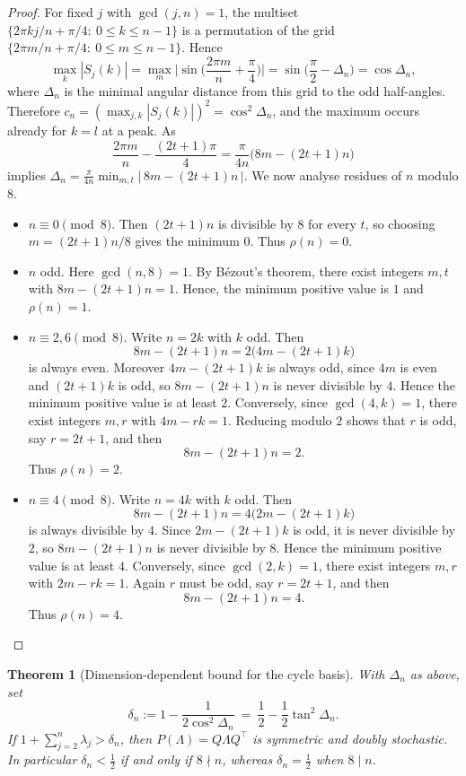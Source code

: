 \documentclass[12pt,fleqn]{amsart}
\renewcommand{\le}{\leqslant}
\newtheorem{thm}{Theorem}
\theoremstyle{definition}
\theoremstyle{remark}
\newcommand{\1}{\mathbf{1}}
\newcommand{\Lam}{\Lambda}
\begin{document}
\begin{proof}
For fixed $j$ with $\gcd(j,n)=1$, the multiset $\{2\pi kj/n+\pi/4:\ 0\le k\le n-1\}$ is a permutation of the grid $\{2\pi m/n+\pi/4:\ 0\le m\le n-1\}$. Hence
\[
\max_k|S_j(k)|=\max_m\Big|\sin\Big(\frac{2\pi m}{n}+\frac{\pi}{4}\Big)\Big|
=\sin\!\Big(\frac{\pi}{2}-\Delta_n\Big)=\cos\Delta_n,
\]
where $\Delta_n$ is the minimal angular distance from this grid to the odd half-angles. Therefore $c_n=(\max_{j,k}|S_j(k)|)^2=\cos^2\Delta_n$, and the maximum occurs already for $k=l$ at a peak. As
\[
\frac{2\pi m}{n}-\frac{(2t+1)\pi}{4}=\frac{\pi}{4n}\big(8m-(2t+1)n\big)
\]
implies $\Delta_n=\tfrac{\pi}{4n}\min_{m,t}|\,8m-(2t+1)n\,|$. We now analyse residues of $n$ modulo $8$.
\begin{itemize}
\item {$n\equiv0\pmod 8$.}
Then $(2t+1)n$ is divisible by $8$ for every $t$, so choosing $m=(2t+1)n/8$ gives the minimum $0$. Thus $\rho(n)=0$.

\item {$n$ odd.}
Here $\gcd(n,8)=1$. By Bézout's theorem, there exist integers $m,t$ with $8m-(2t+1)n=1$. Hence, the minimum positive value is $1$ and $\rho(n)=1$.

\item {$n\equiv 2,6\pmod 8$.}
Write $n=2k$ with $k$ odd. Then
\[
8m-(2t+1)n = 2\bigl(4m-(2t+1)k\bigr)
\]
is always even. Moreover $4m-(2t+1)k$ is always odd, since $4m$ is even and $(2t+1)k$ is odd, so $8m-(2t+1)n$ is never divisible by $4$. Hence the minimum positive value is at least $2$. Conversely, since $\gcd(4,k)=1$, there exist integers $m,r$ with $4m-rk=1$. Reducing modulo $2$ shows that $r$ is odd, say $r=2t+1$, and then
\[
8m-(2t+1)n = 2.
\]
Thus $\rho(n)=2$.

\item {$n\equiv4\pmod 8$.}
Write $n=4k$ with $k$ odd. Then
\[
8m-(2t+1)n = 4\bigl(2m-(2t+1)k\bigr)
\]
is always divisible by $4$. Since $2m-(2t+1)k$ is odd, it is never divisible by $2$, so $8m-(2t+1)n$ is never divisible by $8$. Hence the minimum positive value is at least $4$. Conversely, since $\gcd(2,k)=1$, there exist integers $m,r$ with $2m-rk=1$. Again $r$ must be odd, say $r=2t+1$, and then
\[
8m-(2t+1)n = 4.
\]
Thus $\rho(n)=4$.
\end{itemize}
\end{proof}

\begin{thm}[Dimension-dependent bound for the cycle basis]\label{thm:cycle}
With $\Delta_n$ as above, set
\[
\delta_n:=1-\frac{1}{2\cos^2\Delta_n}
\ =\ \frac12-\frac12\tan^2\Delta_n.
\]
If $1+\sum_{j=2}^n\lambda_j>\delta_n$, then $P(\Lam)=Q\Lam Q^\top$ is symmetric and doubly stochastic. In particular $\delta_n<\tfrac12$ if and only if $8\nmid n$, whereas $\delta_n=\tfrac12$ when $8\mid n$.
\end{thm}
\end{document}
